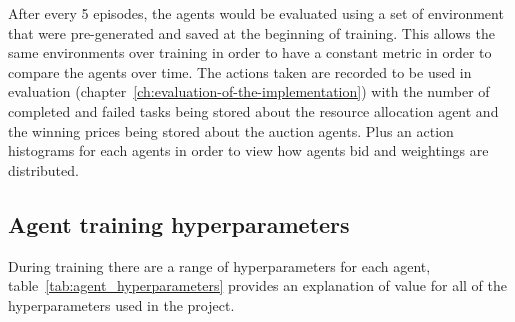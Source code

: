 After every 5 episodes, the agents would be evaluated using a set of environment that were pre-generated and
saved at the beginning of training. This allows the same environments over training in order to have a constant metric
in order to compare the agents over time. The actions taken are recorded to be used in evaluation
(chapter~\ref{ch:evaluation-of-the-implementation}) with the number of completed and failed tasks being stored about
the resource allocation agent and the winning prices being stored about the auction agents. Plus an action histograms
for each agents in order to view how agents bid and weightings are distributed.

\subsection{Agent training hyperparameters}\label{subsec:agent-training-hyperparameters}
During training there are a range of hyperparameters for each agent, table~\ref{tab:agent_hyperparameters} provides
an explanation of value for all of the hyperparameters used in the project.

